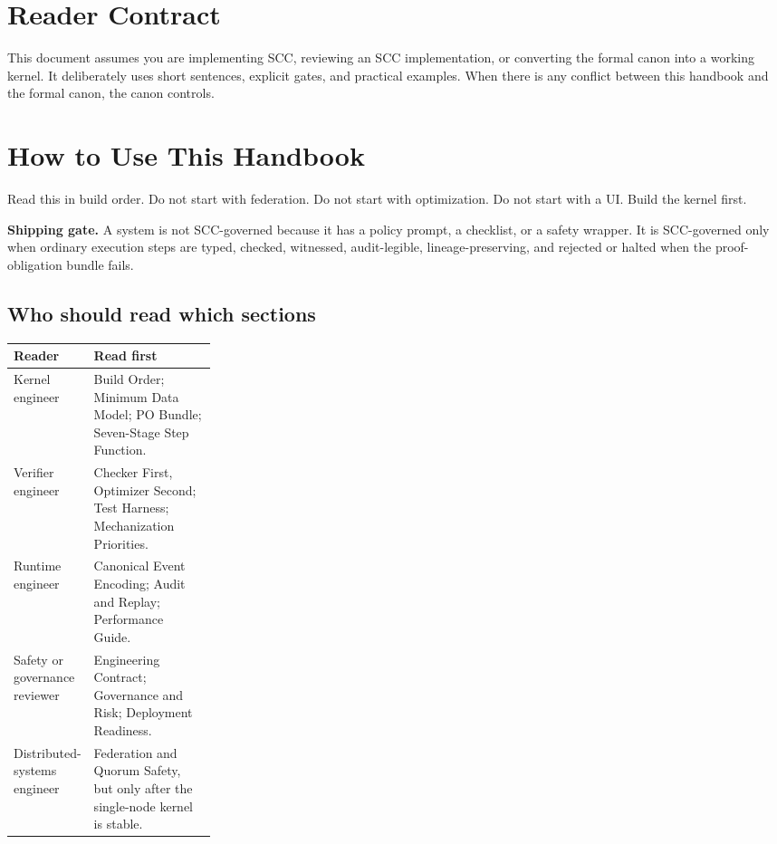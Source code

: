 \documentclass[11pt,oneside]{article}
\newenvironment{shipbox}{\begin{shaded}\noindent\textbf{Shipping gate.} }{\end{shaded}}
\begin{document}
\section*{Reader Contract}
This document assumes you are implementing SCC, reviewing an SCC implementation, or converting the formal canon into a working kernel. It deliberately uses short sentences, explicit gates, and practical examples. When there is any conflict between this handbook and the formal canon, the canon controls.

\tableofcontents
\newpage
{}

\section{How to Use This Handbook}
Read this in build order. Do not start with federation. Do not start with optimization. Do not start with a UI. Build the kernel first.

\begin{shipbox}
A system is not SCC-governed because it has a policy prompt, a checklist, or a safety wrapper. It is SCC-governed only when ordinary execution steps are typed, checked, witnessed, audit-legible, lineage-preserving, and rejected or halted when the proof-obligation bundle fails.
\end{shipbox}

\subsection{Who should read which sections}
\begin{tabularx}{\linewidth}{@{}p{0.26\linewidth}Y@{}}
\toprule
\textbf{Reader} & \textbf{Read first} \\
\midrule
Kernel engineer & Build Order; Minimum Data Model; PO Bundle; Seven-Stage Step Function. \\
Verifier engineer & Checker First, Optimizer Second; Test Harness; Mechanization Priorities. \\
Runtime engineer & Canonical Event Encoding; Audit and Replay; Performance Guide. \\
Safety or governance reviewer & Engineering Contract; Governance and Risk; Deployment Readiness. \\
Distributed-systems engineer & Federation and Quorum Safety, but only after the single-node kernel is stable. \\
\bottomrule
\end{tabularx}
\end{document}
